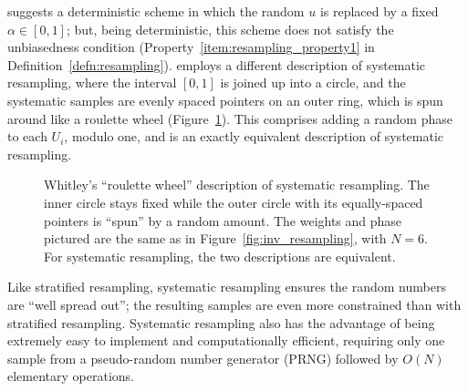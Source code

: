 \textcite{kitagawa1996} suggests a deterministic scheme in which the random $u$ is replaced by a fixed $\alpha\in[0,1]$; but, being deterministic, this scheme does not satisfy the unbiasedness condition (Property~\ref{item:resampling_property1} in Definition~\ref{defn:resampling}).
\textcite{whitley1994} employs a different description of systematic resampling, where the interval $[0,1]$ is joined up into a circle, and the systematic samples are evenly spaced pointers on an outer ring, which is spun around like a roulette wheel (Figure~\ref{fig:roulettewheel}). This comprises adding a random phase to each $U_i$, modulo one, and is an exactly equivalent description of systematic resampling.

\begin{figure}[ht]
\centering
{}
\caption[Whitley's roulette wheel]{Whitley's ``roulette wheel'' description of systematic resampling. The inner circle stays fixed while the outer circle with its equally-spaced pointers is ``spun'' by a random amount. The weights and phase pictured are the same as in Figure~\ref{fig:inv_resampling}, with $N=6$. For systematic resampling, the two descriptions are equivalent.}
\label{fig:roulettewheel}
\end{figure}

Like stratified resampling, systematic resampling ensures the random numbers are ``well spread out''; the resulting samples are even more constrained than with stratified resampling. 
Systematic resampling also has the advantage of being extremely easy to implement and computationally efficient, requiring only one sample from a pseudo-random number generator (PRNG) followed by $O(N)$ elementary operations.

